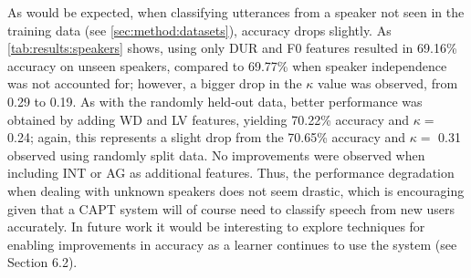 \documentclass[a4paper]{article}
\begin{document}
		{\color{blue}
		As would be expected, when classifying utterances from a speaker not seen in the training data (see \cref{sec:method:datasets}), accuracy drops slightly. As  \cref{tab:results:speakers} shows, using only DUR and F0 features resulted in 69.16\% accuracy on unseen speakers, compared to 69.77\% when speaker independence was not accounted for; however, a bigger drop in the $\kappa$ value was observed, from 0.29 to 0.19. As with the randomly held-out data, better performance was obtained by adding WD and LV features, yielding 70.22\% accuracy and $\kappa =$ 0.24; again, this represents a slight drop from the 70.65\% accuracy  and $\kappa =$ 0.31 observed using randomly split data. No improvements were observed when including INT or AG as additional features. 
		Thus, the performance degradation when dealing with unknown speakers does not seem drastic, which is encouraging given that a CAPT system will of course need to classify speech from new users accurately.
		In future work it would be interesting to explore techniques for enabling improvements in accuracy as a learner continues to use the system (see Section 6.2).
		}
		
		
		
\end{document}
